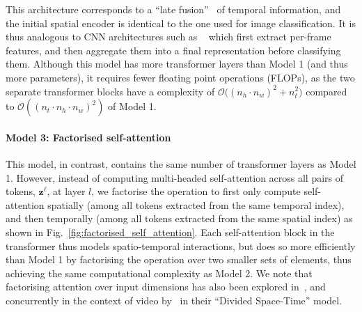 This architecture corresponds to a ``late fusion''~\cite{karpathy_cvpr_2014, simonyan_neurips_2014, wang_tsn_eccv_2016, neimark_arxiv_2021} of temporal information, and the initial spatial encoder is identical to the one used for image classification.
It is thus analogous to CNN architectures such as ~\cite{girdhar_neurips_2017, karpathy_cvpr_2014, wang_tsn_eccv_2016, zhou_trn_eccv_2018} which first extract per-frame features, and then aggregate them into a final representation before classifying them. %
Although this model has more transformer layers than Model 1 (and thus more parameters), it requires fewer floating point operations (FLOPs), as the two separate transformer blocks have a complexity of $\mathcal{O}({(n_h \cdot n_w)^2 + n_t^2)}$ compared to $\mathcal{O}((n_t \cdot n_h \cdot n_w)^2)$ of Model 1.


\paragraph{Model 3: Factorised self-attention}


This model, in contrast, contains the same number of transformer layers as Model 1.
However, instead of computing multi-headed self-attention across all pairs of tokens, $\mathbf{z}^{\ell}$, at layer $l$, we factorise the operation to first only compute self-attention spatially (among all tokens extracted from the same temporal index), and then temporally (among all tokens extracted from the same spatial index) as shown in Fig.~\ref{fig:factorised_self_attention}.
Each self-attention block in the transformer thus models spatio-temporal interactions, but does so more efficiently than Model 1 by factorising the operation over two smaller sets of elements, thus achieving the same computational complexity as Model 2. %
We note that factorising attention over input dimensions has also been explored in~\cite{ho_arxiv_2019, weissenborn_iclr_2020}, and concurrently in the context of video by~\cite{bertasius_arxiv_2021} in their ``Divided Space-Time'' model.

